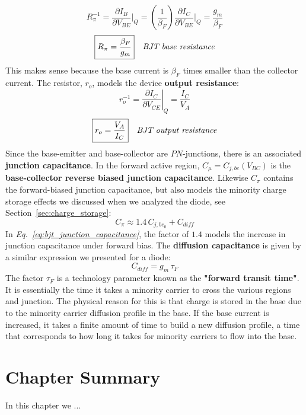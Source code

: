     \begin{equation}
        R_\pi^{-1} = \frac{\partial I_B}{\partial V_{BE}} \bigg\rvert_Q
        = \left( \frac{1}{\beta_F} \right) \frac{\partial I_C}{\partial V_{BE}} \bigg\rvert_Q
        = \frac{g_m}{\beta_F}
    \end{equation}
    \begin{align}
        \Aboxed{R_\pi &= \frac{\beta_F}{g_m}} &\textit{BJT base resistance}
        \label{eq:bjt_base_resistance}
    \end{align}
This makes sense because the base current is $\beta_F$ times smaller than the collector current.  The resistor, $r_o$, models the device \textbf{output resistance}: 
    \begin{equation}
        r_o^{-1} = \left. \frac{\partial I_C}{\partial V_{CE}} \right|_Q  = \frac{I_C}{V_A}
    \end{equation}
    \begin{align}
        \Aboxed{r_o &= \frac{V_A}{I_C}} &\textit{BJT output resistance}
        \label{eq:bjt_output_resistance}
    \end{align}
Since the base-emitter and base-collector are $PN$-junctions, there is an associated \textbf{junction capacitance}.  In the forward active region, $C_{\mu} = C_{j,bc}(V_{BC})$ is the \textbf{base-collector reverse biased junction capacitance}.  Likewise $C_\pi$ contains the forward-biased junction capacitance, but also models the minority charge storage effects we discussed when we analyzed the diode, see Section~\ref{sec:charge_storage}:
    \begin{equation}
        C_\pi \approx 1.4\,C_{j,be_0} + C_{diff}
        \label{eq:bjt_junction_capacitance}
    \end{equation}
In \emph{Eq.~\ref{eq:bjt_junction_capacitance}}, the factor of $1.4$ models the increase in junction capacitance under forward bias.  The \textbf{diffusion capacitance} is given by a similar expression we presented for a diode:
    \begin{equation}
        C_{diff} = g_m\,\tau_F
        \label{eq:bjt_diffusion_capacitance}
    \end{equation}
The factor $\tau_F$ is a technology parameter known as the \textbf{"forward transit time"}.  It is essentially the time it takes a minority carrier to cross the various regions and junction.  The physical reason for this is that charge is stored in the base due to the minority carrier diffusion profile in the base.  If the base current is increased, it takes a finite amount of time to build a new diffusion profile, a time that corresponds to how long it takes for minority carriers to flow into the base.
\newpage
\section{Chapter Summary}
In this chapter we ...
